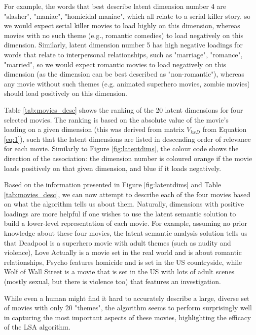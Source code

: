 \documentclass[11pt,a4paper]{article}
\begin{document}
For example, the words that best describe latent dimension number 4 are "slasher", "maniac", "homicidal maniac", which all relate to a serial killer story, so we would expect serial killer movies to load highly on this dimension, whereas movies with no such theme (e.g., romantic comedies) to load negatively on this dimension. Similarly, latent dimension number 5 has high negative loadings for words that relate to interpersonal relationships, such as "marriage", "romance", "married", so we would expect romantic movies to load negatively on this dimension (as the dimension can be best described as "non-romantic"), whereas any movie without such themes (e.g. animated superhero movies, zombie movies) should load positively on this dimension. 

Table \ref{tab:movies_desc} shows the ranking of the 20 latent dimensions for four selected movies. The ranking is based on the absolute value of the movie's loading on a given dimension (this was derived from matrix $V_{kxD}$ from Equation \ref{eq:1}), such that the latent dimensions are listed in descending order of relevance for each movie. Similarly to Figure \ref{fig:latentdims}, the colour code shows the direction of the association: the dimension number is coloured orange if the movie loads positively on that given dimension, and blue if it loads negatively.

 Based on the information presented in Figure \ref{fig:latentdims} and Table \ref{tab:movies_desc}, we can now attempt to describe each of the four movies based on what the algorithm tells us about them. Naturally, dimensions with positive loadings are more helpful if one wishes to use the latent semantic solution to build a lower-level representation of each movie. For example, assuming no prior knowledge about these four movies, the latent semantic analysis solution tells us that Deadpool is a superhero movie with adult themes (such as nudity and violence), Love Actually is a movie set in the real world and is about romantic relationships, Psycho features homicide and is set in the US countryside, while Wolf of Wall Street is a movie that is set in the US with lots of adult scenes (mostly sexual, but there is violence too) that features an investigation. 
 
 While even a human might find it hard to accurately describe a large, diverse set of movies with only 20 "themes", the algorithm seems to perform surprisingly well in capturing the most important aspects of these movies, highlighting the efficacy of the LSA algorithm. 
\end{document}
